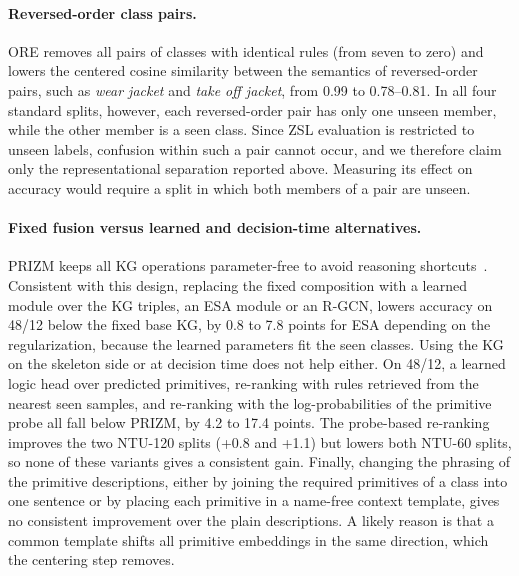 \documentclass[11pt]{article}
\begin{document}
\paragraph{Reversed-order class pairs.}
ORE removes all pairs of classes with identical rules (from seven to zero) and lowers the centered cosine similarity between the semantics of reversed-order pairs, such as \emph{wear jacket} and \emph{take off jacket}, from 0.99 to 0.78--0.81. In all four standard splits, however, each reversed-order pair has only one unseen member, while the other member is a seen class. Since ZSL evaluation is restricted to unseen labels, confusion within such a pair cannot occur, and we therefore claim only the representational separation reported above. Measuring its effect on accuracy would require a split in which both members of a pair are unseen.

\paragraph{Fixed fusion versus learned and decision-time alternatives.}
PRIZM keeps all KG operations parameter-free to avoid reasoning shortcuts~\cite{marconato26,andolfi25}. Consistent with this design, replacing the fixed composition with a learned module over the KG triples, an ESA module or an R-GCN, lowers accuracy on 48/12 below the fixed base KG, by 0.8 to 7.8 points for ESA depending on the regularization, because the learned parameters fit the seen classes. Using the KG on the skeleton side or at decision time does not help either. On 48/12, a learned logic head over predicted primitives, re-ranking with rules retrieved from the nearest seen samples, and re-ranking with the log-probabilities of the primitive probe all fall below PRIZM, by 4.2 to 17.4 points. The probe-based re-ranking improves the two NTU-120 splits (+0.8 and +1.1) but lowers both NTU-60 splits, so none of these variants gives a consistent gain. Finally, changing the phrasing of the primitive descriptions, either by joining the required primitives of a class into one sentence or by placing each primitive in a name-free context template, gives no consistent improvement over the plain descriptions. A likely reason is that a common template shifts all primitive embeddings in the same direction, which the centering step removes.



\end{document}
